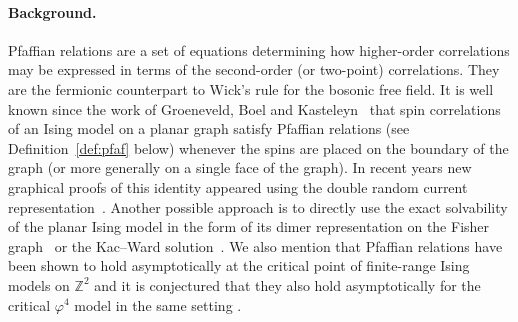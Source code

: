 \documentclass{article}
\numberwithin{equation}{section}
\theoremstyle{definition}
\theoremstyle{definition}
\theoremstyle{remark}
\newcommand\vp{\varphi}
\newcommand{\Z}{\mathbb{Z}}
\begin{document}
\paragraph{Background. }Pfaffian relations are a set of equations determining how higher-order correlations may be expressed in terms of the second-order (or two-point) correlations. They are the fermionic counterpart to Wick's rule for the bosonic free field. It is well known since the work of Groeneveld, Boel and Kasteleyn~\cite{GBK} 
that spin correlations of an Ising model on a planar graph
satisfy Pfaffian relations (see Definition~\ref{def:pfaf} below) 
whenever the spins are placed on the boundary of the graph (or more generally on a single face of the graph). 
In recent years new graphical proofs of this identity appeared using 
the double random current representation~\cites{LisT,ADTW}. Another possible approach is to directly use the exact solvability of 
the planar Ising model in the form of its dimer representation on the Fisher graph~\cite{FisherDim} 
or the Kac--Ward solution~\cite{KacWard}. We also mention that Pfaffian relations have been shown to hold asymptotically at the critical point of finite-range Ising models on $\Z^2$ \cite{ADTW} and it is conjectured that they also hold asymptotically for the critical $\vp^4$ model in the same setting \cite[Problem 2]{GPPS}.
\end{document}
